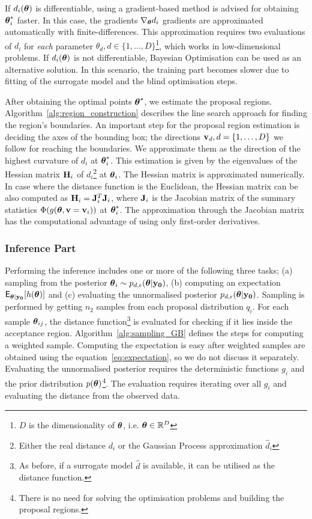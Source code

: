 If \(d_i(\boldsymbol{\theta})\) is differentiable, using a gradient-based method
is advised for obtaining \(\boldsymbol{\theta}_i^*\) faster. In this case, the
gradients \(\nabla_{\boldsymbol{\theta}} d_i\) gradients are approximated
automatically with finite-differences. This approximation requires two
evaluations of \(d_i\) for \emph{each} parameter
\(\theta_d, d \in \{1, \ldots, D\}\)\footnote{\(D\) is the
  dimensionality of \(\boldsymbol{\theta}\), i.e.  \(\boldsymbol{\theta} \in \mathbb{R}^D\)},
which works in low-dimensional problems. If \(d_i(\boldsymbol{\theta})\) is not
differentiable, Bayesian Optimisation can be used as an alternative
solution. In this scenario, the training part becomes slower due to
fitting of the surrogate model and the blind optimisation steps.

After obtaining the optimal points \(\boldsymbol{\theta}^*\), we estimate the
proposal regions. Algorithm~\ref{alg:region_construction} describes
the line search approach for finding the region's boundaries. An
important step for the proposal region estimation is deciding the axes
of the bounding box; the directions \(\mathbf{v}_d, d = \{1, \ldots, D\}\) we
follow for reaching the boundaries. We approximate them as the
direction of the highest curvature of \(d_i\) at \(\boldsymbol{\theta}_i^*\). This
estimation is given by the eigenvalues of the Hessian matrix
\(\mathbf{H}_i\) of \(d_i\)\footnote{Either the real distance \(d_i\) or
  the Gaussian Process approximation \(\hat{d}_i\)} at
\(\boldsymbol{\theta}_i\). The Hessian matrix is approximated numerically. In case
where the distance function is the Euclidean, the Hessian matrix can
be also computed as \(\mathbf{H}_i = \mathbf{J}_i^T\mathbf{J}_i\), where \(\mathbf{J}_i\)
is the Jacobian matrix of the summary statistics
\(\Phi(g(\boldsymbol{\theta}, \mathbf{v}=\mathbf{v}_i))\) at \(\boldsymbol{\theta}_i^*\). The approximation
through the Jacobian matrix has the computational advantage of using
only first-order derivatives.

\subsubsection*{Inference Part}
Performing the inference includes one or more of the following three
tasks; (a) sampling from the posterior
\( \boldsymbol{\theta}_i \sim p_{d, \epsilon}(\boldsymbol{\theta}|\mathbf{y_0})\), (b) computing an
expectation \(\mathsf{E}_{\boldsymbol{\theta}|\mathbf{y_0}}[h(\boldsymbol{\theta})]\) and (c) evaluating the
unnormalised posterior \(p_{d, \epsilon}(\boldsymbol{\theta}|\mathbf{y_0})\). Sampling is
performed by getting \(n_2\) samples from each proposal distribution
\(q_i\). For each sample \(\boldsymbol{\theta}_{ij}\), the distance
function\footnote{As before, if a surrogate model \(\hat{d}\) is
  available, it can be utilised as the distance function.} is
evaluated for checking if it lies inside the acceptance
region. Algorithm~\ref{alg:sampling_GB} defines the steps for
computing a weighted sample. Computing the expectation is easy after
weighted samples are obtained using the equation~\ref{eq:expectation},
so we do not discuss it separately. Evaluating the unnormalised
posterior requires the deterministic functions \(g_i\) and the prior
distribution \(p(\boldsymbol{\theta})\)\footnote{There is no need for solving the
  optimisation problems and building the proposal regions.}. The
evaluation requires iterating over all \(g_i\) and evaluating the
distance from the observed data.

